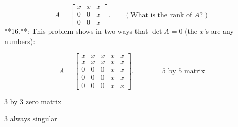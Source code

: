 \[A=\begin{bmatrix}x&x&x\\ 0&0&x\\ 0&0&x\end{bmatrix}.\qquad(\text{What is the rank of }A\text{?})\]
**16.**: This problem shows in two ways that \(\det A=0\) (the \(x\)'s are any numbers):

\[A=\begin{bmatrix}x&x&x&x&x\\ x&x&x&x&x\\ 0&0&0&x&x\\ 0&0&0&x&x\\ 0&0&0&x&x\end{bmatrix}.\qquad\qquad\text{$5$ by 5 matrix}\]

3 by 3 zero matrix

3 always singular